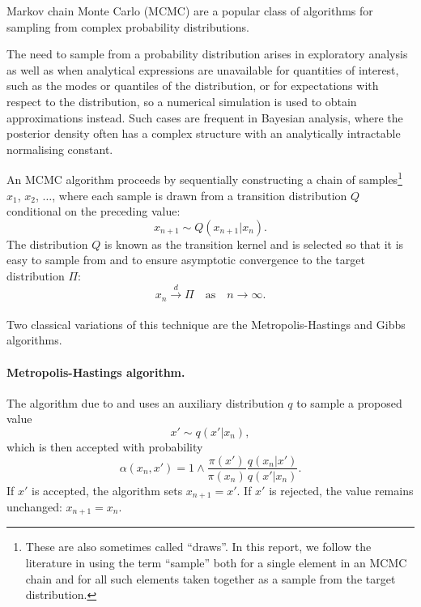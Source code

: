 \documentclass[11pt,a4paper]{report}
\begin{document}
Markov chain Monte Carlo (MCMC) are a popular class of algorithms for sampling from complex probability distributions.

The need to sample from a probability distribution arises in exploratory analysis as well as when analytical expressions are unavailable for quantities of interest, such as the modes or quantiles of the distribution, or for expectations with respect to the distribution, so a numerical simulation is used to obtain approximations instead. Such cases are frequent in Bayesian analysis, where the posterior density often has a complex structure with an analytically intractable normalising constant.



An MCMC algorithm proceeds by sequentially constructing a chain of samples\footnote{These are also sometimes called ``draws''. In this report, we follow the literature in using the term ``sample'' both for a single element in an MCMC chain and for all such elements taken together as a sample from the target distribution.} $x_1$, $x_2$, $\dots$,  where each sample is drawn from a transition distribution $Q$ conditional on the preceding value:
$$x_{n+1} \sim Q(x_{n+1}|x_n).$$
The distribution $Q$ is known as the transition kernel and is selected so that it is easy to sample from and to ensure asymptotic convergence to the target distribution $\Pi$:
$$x_n \xrightarrow[]{d} \Pi \quad\text{as}\quad n \to \infty.$$

Two classical variations of this technique are the Metropolis-Hastings and Gibbs algorithms.

\paragraph{Metropolis-Hastings algorithm.} The algorithm due to \cite{metropolisEquationStateCalculations1953} and \cite{hastingsMonteCarloSampling1970} uses an auxiliary distribution $q$ to sample a proposed value
$$x' \sim q(x' | x_n),$$
which is then accepted with probability
$$\alpha(x_n, x') = 1 \wedge \frac{\pi(x')}{\pi(x_n)} \frac{q(x_n|x')}{q(x'|x_n)}.$$
If $x'$ is accepted, the algorithm sets $x_{n+1} = x'$. If $x'$ is rejected, the value remains unchanged: $x_{n+1} = x_n$.

\end{document}
